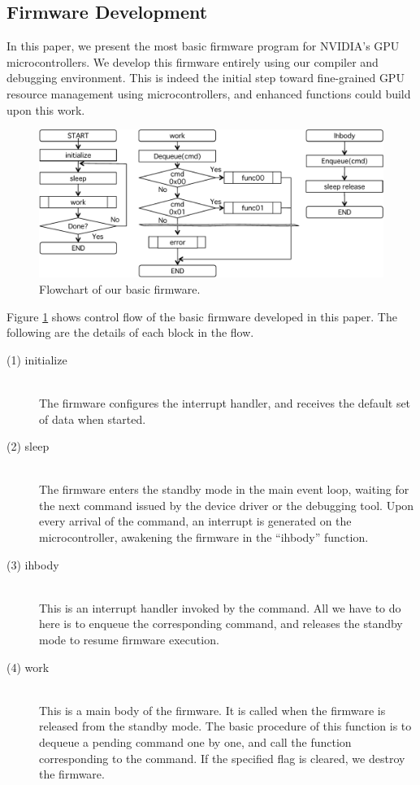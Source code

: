 \subsection{Firmware Development}

In this paper, we present the most basic firmware program for NVIDIA's
GPU microcontrollers.
We develop this firmware entirely using our compiler and debugging
environment.
This is indeed the initial step toward fine-grained GPU resource
management using microcontrollers, and enhanced functions could build
upon this work.

\begin{figure}[!t]
 \begin{center}
  \includegraphics[width=12cm]{./img/firmware.pdf}
 \end{center}
 \caption{Flowchart of our basic firmware.}
 \label{fig:firmware}
\end{figure}

Figure \ref{fig:firmware} shows control flow of the basic firmware
developed in this paper.
The following are the details of each block in the flow.

\begin{description}
 \item[(1) initialize]\mbox{}\\
	    The firmware configures the interrupt handler, and receives
	    the default set of data when started.
 \item[(2) sleep]\mbox{}\\
	    The firmware enters the standby mode in the main event loop,
	    waiting for the next command issued by the device driver or
	    the debugging tool.
	    Upon every arrival of the command, an interrupt is generated
	    on the microcontroller, awakening the firmware in the
	    ``ihbody'' function. 
 \item[(3) ihbody] \mbox{}\\
	    This is an interrupt handler invoked by the command.
	    All we have to do here is to enqueue the corresponding
	    command, and releases the standby mode to resume firmware
	    execution.
 \item[(4) work] \mbox{}\\
	    This is a main body of the firmware.
	    It is called when the firmware is released from the standby
	    mode.
	    The basic procedure of this function is to dequeue a pending
	    command one by one, and call the function corresponding to
	    the command.
	    If the specified flag is cleared, we destroy the firmware. 
\end{description}

